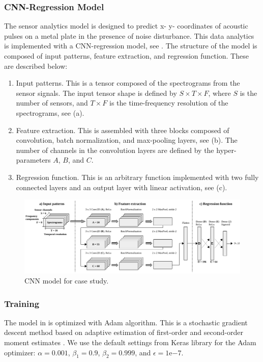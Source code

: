 \subsubsection{CNN-Regression Model}
The sensor analytics model is designed to predict x- y- coordinates of acoustic pulses on a metal plate in the presence of noise disturbance. This data analytics is implemented with a CNN-regression model, see . The structure of the model is composed of input patterns, feature extraction, and regression function. These are described below:

\begin{enumerate}[label=\alph*)]
\item Input patterns. This is a tensor composed of the spectrograms from the sensor signals. The input tensor shape is defined by $S \times T \times F$, where $S$ is the number of sensors, and $T \times F$ is the time-frequency resolution of the spectrograms, see (a).

\item Feature extraction. This is assembled with three blocks composed of convolution, batch normalization, and max-pooling layers, see (b). The number of channels in the convolution layers are defined by the hyper-parameters $A$, $B$, and $C$.

\item Regression function. This is an arbitrary function implemented with two fully connected layers and an output layer with linear activation, see (c).
\end{enumerate}


\begin{figure}[t!]
	\centering
	\includegraphics[width=\textwidth]{../figures/model.pdf}
	\caption{CNN model for case study.}
	\label{fig:model}
\end{figure}


\subsubsection{Training}
The model in  is optimized with Adam algorithm. This is a stochastic gradient descent method based on adaptive estimation of first-order and second-order moment estimates \cite{kingma2014adam}. We use the default settings from Keras library for the Adam optimizer: $\alpha = 0.001$, $\beta_1 = 0.9$, $\beta_2 = 0.999$, and $\epsilon = 1\mathrm{e}{-7}$.


